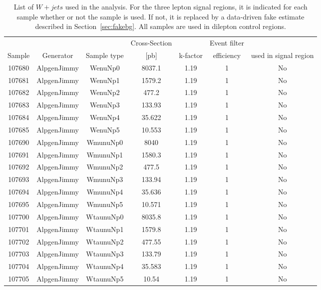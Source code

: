 \begin{table}[ht!]
\centering
  \begin{footnotesize}

\begin{tabular}{c|c|c|c|c|c|c}
\hline
    &  &  & Cross-Section &  & Event filter  \\
  Sample  & Generator & Sample type & [pb] & k-factor &  efficiency  & used in signal region\\
\hline \hline
107680 & AlpgenJimmy & WenuNp0  &  8037.1  &  1.19  &  1  & No \\
107681 & AlpgenJimmy & WenuNp1  &  1579.2  &  1.19  &  1  & No \\
107682 & AlpgenJimmy & WenuNp2  &  477.2   &  1.19  &  1  & No \\
107683 & AlpgenJimmy & WenuNp3  &  133.93  &  1.19  &  1  & No \\
107684 & AlpgenJimmy & WenuNp4  &  35.622  &  1.19  &  1  & No \\
107685 & AlpgenJimmy & WenuNp5  &  10.553  &  1.19  &  1  & No \\
107690 & AlpgenJimmy & WmunuNp0  &  8040   &  1.19  &  1  & No \\
107691 & AlpgenJimmy & WmunuNp1  &  1580.3 &  1.19  &  1  & No \\
107692 & AlpgenJimmy & WmunuNp2  &  477.5  &  1.19  &  1  & No \\
107693 & AlpgenJimmy & WmunuNp3  &  133.94 &  1.19  &  1  & No \\
107694 & AlpgenJimmy & WmunuNp4  &  35.636 &  1.19  &  1  & No \\
107695 & AlpgenJimmy & WmunuNp5  &  10.571 &  1.19  &  1  & No \\
107700 & AlpgenJimmy & WtaunuNp0  &  8035.8&  1.19  &  1  & No \\
107701 & AlpgenJimmy & WtaunuNp1  &  1579.8 &  1.19  &  1  & No \\
107702 & AlpgenJimmy & WtaunuNp2  &  477.55 &  1.19  &  1  & No \\
107703 & AlpgenJimmy & WtaunuNp3  &  133.79 &  1.19  &  1  & No \\
107704 & AlpgenJimmy & WtaunuNp4  &  35.583 &  1.19  &  1  & No \\
107705 & AlpgenJimmy & WtaunuNp5  &  10.54  &  1.19  &  1  & No \\
\hline 
\end{tabular}
  \end{footnotesize}

\caption{List of $W+jets$ used in the analysis.  
For the three lepton signal regions, it is indicated for each
sample whether or not the sample is used.  If not, it is replaced
by a data-driven fake estimate described in Section~\ref{sec:fakebg}.
All samples are used in dilepton control regions.
}
\label{tab:sample_bkg_wjets}
\end{table}


